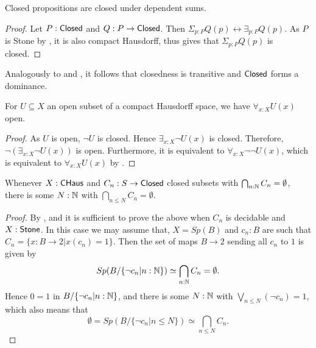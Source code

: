 \begin{corollary}\label{ClosedDependentSums}
  Closed propositions are closed under dependent sums. 
\end{corollary}
\begin{proof}
  Let $P:\mathsf{Closed}$ and $Q:P \to \mathsf{Closed}$. 
  Then $\Sigma_{p:P} Q(p) \leftrightarrow \exists_{p:P} Q(p)$.
  As $P$ is Stone by , it is also compact Hausdorff, thus
   gives that $\Sigma_{p:P} Q(p)$ is closed. 
\end{proof}
\begin{remark}
  Analogously to  and , it follows that 
  closedness is transitive and $\mathsf{Closed}$ forms a dominance. 
\end{remark}
\begin{corollary}\label{AllOpenSubspaceOpen}
  For $U\subseteq X$ an open subset of a compact Hausdorff space, we have 
  $\forall_{x:X} U(x)$ open. 
\end{corollary}
\begin{proof}
  As $U$ is open, $\neg U$ is closed. 
  Hence $\exists_{x:X} \neg U(x)$ is closed. 
  Therefore, $\neg (\exists_{x:X} \neg U(x))$ is open. 
  Furthermore, it is equivalent to $\forall_{x:X} \neg \neg U(x)$, 
  which is equivalent to $\forall_{x:X} U(x)$ by .
\end{proof}

\begin{lemma}\label{CHausFiniteIntersectionProperty}
  Whenever $X:\mathsf{CHaus}$ and $C_n:S\to \mathsf{Closed}$ closed subsets with $\bigcap_{n:\mathbb{N}} C_n =\emptyset$, there is some $N:\mathbb{N}$ 
  with $\bigcap_{n\leq N} C_n  = \emptyset$. 
\end{lemma}
\begin{proof}
  By , and  
  it is sufficient to prove the above when $C_n$ is decidable and $X:\mathsf{Stone}$.
  In this case we may assume that, 
  $X=Sp(B)$ and $c_n:B$ are such that $C_n = \{x:B\to 2 | x(c_n) = 1\}$. 
  Then the set of maps $B\to 2$ sending all $c_n$ to $1$ is given by 
  $$Sp(B/\{\neg c_n |n:\mathbb{N}\}) \simeq \bigcap_{n:\mathbb{N}} C_n = \emptyset .$$
  Hence 
  $0=1$ in $B/\{\neg c_n|{n:\mathbb{N}}\}$, and there is some $N:\mathbb{N}$ with 
  $\bigvee_{n\leq N} (\neg c_n) = 1$, which also means that 
  $$\emptyset = Sp(B/\{ \neg c_n| n \leq N\})  \simeq \bigcap_{n\leq N} C_n .$$
\end{proof}



